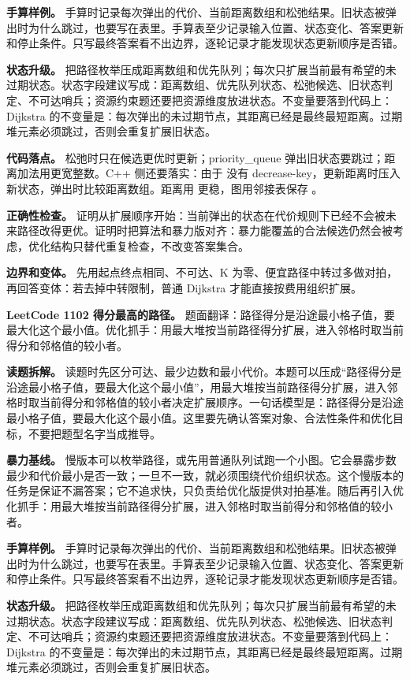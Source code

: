 \textbf{手算样例。} 手算时记录每次弹出的代价、当前距离数组和松弛结果。旧状态被弹出时为什么跳过，也要写在表里。手算表至少记录输入位置、状态变化、答案更新和停止条件。只写最终答案看不出边界，逐轮记录才能发现状态更新顺序是否错。

\textbf{状态升级。} 把路径枚举压成距离数组和优先队列；每次只扩展当前最有希望的未过期状态。状态字段建议写成：距离数组、优先队列状态、松弛候选、旧状态判定、不可达哨兵；资源约束题还要把资源维度放进状态。不变量要落到代码上：Dijkstra 的不变量是：每次弹出的未过期节点，其距离已经是最终最短距离。过期堆元素必须跳过，否则会重复扩展旧状态。

\textbf{代码落点。} 松弛时只在候选更优时更新；priority\_queue 弹出旧状态要跳过；距离加法用更宽整数。C++ 侧还要落实：由于  没有 decrease-key，更新距离时压入新状态，弹出时比较距离数组。距离用  更稳，图用邻接表保存 。

\textbf{正确性检查。} 证明从扩展顺序开始：当前弹出的状态在代价规则下已经不会被未来路径改得更优。证明时把算法和暴力版对齐：暴力能覆盖的合法候选仍然会被考虑，优化结构只替代重复检查，不改变答案集合。

\textbf{边界和变体。} 先用起点终点相同、不可达、K 为零、便宜路径中转过多做对拍，再回答变体：若去掉中转限制，普通 Dijkstra 才能直接按费用组织扩展。

\noindent\textbf{LeetCode 1102 得分最高的路径。} 题面翻译：路径得分是沿途最小格子值，要最大化这个最小值。优化抓手：用最大堆按当前路径得分扩展，进入邻格时取当前得分和邻格值的较小者。

\textbf{读题拆解。} 读题时先区分可达、最少边数和最小代价。本题可以压成“路径得分是沿途最小格子值，要最大化这个最小值”，用最大堆按当前路径得分扩展，进入邻格时取当前得分和邻格值的较小者决定扩展顺序。一句话模型是：路径得分是沿途最小格子值，要最大化这个最小值。这里要先确认答案对象、合法性条件和优化目标，不要把题型名字当成推导。

\textbf{暴力基线。} 慢版本可以枚举路径，或先用普通队列试跑一个小图。它会暴露步数最少和代价最小是否一致；一旦不一致，就必须围绕代价组织状态。这个慢版本的任务是保证不漏答案；它不追求快，只负责给优化版提供对拍基准。随后再引入优化抓手：用最大堆按当前路径得分扩展，进入邻格时取当前得分和邻格值的较小者。

\textbf{手算样例。} 手算时记录每次弹出的代价、当前距离数组和松弛结果。旧状态被弹出时为什么跳过，也要写在表里。手算表至少记录输入位置、状态变化、答案更新和停止条件。只写最终答案看不出边界，逐轮记录才能发现状态更新顺序是否错。

\textbf{状态升级。} 把路径枚举压成距离数组和优先队列；每次只扩展当前最有希望的未过期状态。状态字段建议写成：距离数组、优先队列状态、松弛候选、旧状态判定、不可达哨兵；资源约束题还要把资源维度放进状态。不变量要落到代码上：Dijkstra 的不变量是：每次弹出的未过期节点，其距离已经是最终最短距离。过期堆元素必须跳过，否则会重复扩展旧状态。

